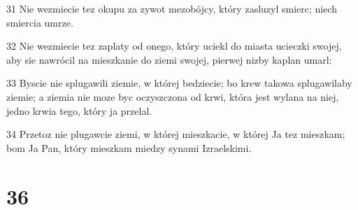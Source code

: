 \par 31 Nie wezmiecie tez okupu za zywot mezobójcy, który zasluzyl smierc; niech smiercia umrze.
\par 32 Nie wezmiecie tez zaplaty od onego, który uciekl do miasta ucieczki swojej, aby sie nawrócil na mieszkanie do ziemi swojej, pierwej nizby kaplan umarl:
\par 33 Byscie nie splugawili ziemie, w której bedziecie; bo krew takowa splugawilaby ziemie; a ziemia nie moze byc oczyszczona od krwi, która jest wylana na niej, jedno krwia tego, który ja przelal.
\par 34 Przetoz nie plugawcie ziemi, w której mieszkacie, w której Ja tez mieszkam; bom Ja Pan, który mieszkam miedzy synami Izraelskimi.

\chapter{36}

